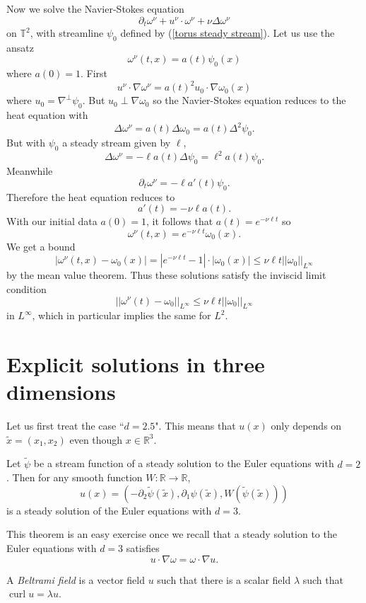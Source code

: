 \documentclass[12pt]{book}
\newcommand{\RR}{\mathbb{R}}
\newcommand{\Torus}{\mathbb{T}}
\DeclareMathOperator{\curl}{curl}
\newcommand{\dfn}[1]{\emph{#1}\index{#1}}
\theoremstyle{definition}
\newenvironment{definition}
  {\pushQED{\qed}\renewcommand{\qedsymbol}{$\diamondsuit$}\definitionx}
  {\popQED\endexamplex}
\newenvironment{example}
  {\pushQED{\qed}\renewcommand{\qedsymbol}{$\diamondsuit$}\examplex}
  {\popQED\endexamplex}
\newenvironment{theoremx}
        {\pushQED{\qed}\renewcommand{\qedsymbol}{$\diamondsuit$}\theoremxx}
        {\popQED\endexamplex}
\begin{document}
\begin{example}
Now we solve the Navier-Stokes equation
$$\partial_t \omega^\nu + u^\nu \cdot \omega^\nu + \nu \Delta \omega^\nu$$
on $\Torus^2$, with streamline $\psi_0$ defined by (\ref{torus steady stream}).
Let us use the ansatz
$$\omega^\nu(t, x) = a(t) \psi_0(x)$$
where $a(0) = 1$.
First
$$u^\nu \cdot \nabla \omega^\nu = a(t)^2 u_0 \cdot \nabla \omega_0(x)$$
where $u_0 = \nabla^\perp \psi_0$.
But $u_0 \perp \nabla \omega_0$ so the Navier-Stokes equation reduces to the heat equation with
$$\Delta \omega^\nu = a(t) \Delta \omega_0 = a(t) \Delta^2 \psi_0.$$
But with $\psi_0$ a steady stream given by $\ell$,
$$\Delta \omega^\nu = -\ell a(t) \Delta \psi_0 = \ell^2 a(t) \psi_0.$$
Meanwhile
$$\partial_t \omega^\nu = -\ell a'(t) \psi_0.$$
Therefore the heat equation reduces to
$$a'(t) = -\nu \ell a(t).$$
With our initial data $a(0) = 1$, it follows that $a(t) = e^{-\nu \ell t}$ so
$$\omega^\nu(t, x) = e^{-\nu \ell t} \omega_0(x).$$
We get a bound
$$|\omega^\nu(t, x) - \omega_0(x)| = |e^{-\nu \ell t} - 1|\cdot|\omega_0(x)| \leq \nu \ell t ||\omega_0||_{L^\infty}$$
by the mean value theorem.
Thus these solutions satisfy the inviscid limit condition
$$||\omega^\nu(t) - \omega_0||_{L^\infty} \leq \nu \ell t ||\omega_0||_{L^\infty}$$
in $L^\infty$, which in particular implies the same for $L^2$.
\end{example}

\section{Explicit solutions in three dimensions}
Let us first treat the case ``$d = 2.5$".
This means that $u(x)$ only depends on $\tilde x = (x_1, x_2)$ even though $x \in \RR^3$.

\begin{theoremx}
Let $\tilde \psi$ be a stream function of a steady solution to the Euler equations with $d = 2$.
Then for any smooth function $W: \RR \to \RR$,
$$u(x) = (-\partial_2 \tilde \psi(\tilde x), \partial_1 \psi(\tilde x), W(\tilde \psi(\tilde x)))$$
is a steady solution of the Euler equations with $d = 3$.
\end{theoremx}

This theorem is an easy exercise once we recall that a steady solution to the Euler equations with $d = 3$ satisfies
$$u \cdot \nabla \omega = \omega \cdot \nabla u.$$

\begin{definition}
A \dfn{Beltrami field} is a vector field $u$ such that there is a scalar field $\lambda$ such that $\curl u = \lambda u$.
\end{definition}
\end{document}
